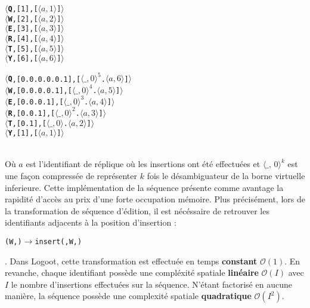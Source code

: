 \begin{itemize}
  \begin{minipage}{0.3\textwidth}
    \begin{alltt}
\(\langle\)\textbf{Q}, [1], [\(\langle a, 1 \rangle\)]\(\rangle\)
\(\langle\)\textbf{W}, [2], [\(\langle a, 2 \rangle\)]\(\rangle\)
\(\langle\)\textbf{E}, [3], [\(\langle a, 3 \rangle\)]\(\rangle\)
\(\langle\)\textbf{R}, [4], [\(\langle a, 4 \rangle\)]\(\rangle\)
\(\langle\)\textbf{T}, [5], [\(\langle a, 5 \rangle\)]\(\rangle\)
\(\langle\)\textbf{Y}, [6], [\(\langle a, 6 \rangle\)]\(\rangle\)
    \end{alltt}
  \end{minipage}
  \hfill
  \begin{minipage}{0.55\textwidth}
    \begin{alltt}
\(\langle\)\textbf{Q}, [0.0.0.0.0.1], [\(\langle \_, 0 \rangle^5\).\(\langle a, 6 \rangle\)]\(\rangle\)
\(\langle\)\textbf{W}, [0.0.0.0.1], [\(\langle \_, 0 \rangle^4\).\(\langle a, 5 \rangle\)]\(\rangle\)
\(\langle\)\textbf{E}, [0.0.0.1], [\(\langle \_, 0 \rangle^3\).\(\langle a, 4 \rangle\)]\(\rangle\)
\(\langle\)\textbf{R}, [0.0.1], [\(\langle \_, 0 \rangle^2\).\(\langle a, 3 \rangle\)]\(\rangle\)
\(\langle\)\textbf{T}, [0.1], [\(\langle \_, 0 \rangle\).\(\langle a, 2 \rangle\)]\(\rangle\)
\(\langle\)\textbf{Y}, [1], [\(\langle a, 1 \rangle\)]\(\rangle\)
    \end{alltt}
  \end{minipage}\\
  Où $a$ est l'identifiant de réplique où les insertions ont été effectuées et
  $\langle \_,\, 0 \rangle^k$ est une façon compressée de représenter $k$ fois
  le désambiguateur de la borne virtuelle inferieure. Cette implémentation de la
  séquence présente comme avantage la rapidité d'accès au prix d'une forte
  occupation mémoire. Plus précisément, lors de la transformation de séquence
  d'édition, il est nécéssaire de retrouver les identifiants adjacents à la
  position d'insertion :
  \begin{alltt}
\centering(W, ) \(\rightarrow\) insert(, W, \DARKBLUE{\(\dashv\)})
  \end{alltt}
  .
  Dans Logoot, cette transformation est effectuée en temps \textbf{constant}
  $\mathcal{O}(1)$. En revanche, chaque identifiant possède une compléxité
  spatiale \textbf{linéaire} $\mathcal{O}(I)$ avec $I$ le nombre d'insertions
  effectuées sur la séquence. N'étant factorisé en aucune manière, la séquence
  possède une complexité spatiale \textbf{quadratique} $\mathcal{O}(I^2)$.


\end{itemize}

